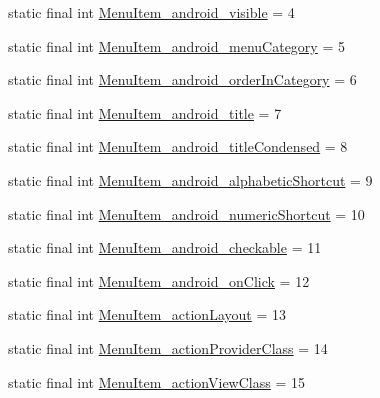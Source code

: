 \begin{DoxyCompactItemize}
\item 
static final int \mbox{\hyperlink{classcom_1_1google_1_1android_1_1gms_1_1R_1_1styleable_ac66c73b7d062d9fbd9d072b092a8cb1e}{Menu\+Item\+\_\+android\+\_\+visible}} = 4
\item 
static final int \mbox{\hyperlink{classcom_1_1google_1_1android_1_1gms_1_1R_1_1styleable_ad9c978e812e621ca253e4d82d4198385}{Menu\+Item\+\_\+android\+\_\+menu\+Category}} = 5
\item 
static final int \mbox{\hyperlink{classcom_1_1google_1_1android_1_1gms_1_1R_1_1styleable_af390bd45b76355084e816767e49eee64}{Menu\+Item\+\_\+android\+\_\+order\+In\+Category}} = 6
\item 
static final int \mbox{\hyperlink{classcom_1_1google_1_1android_1_1gms_1_1R_1_1styleable_a1c0c3275e3807999c30010d6a838b34b}{Menu\+Item\+\_\+android\+\_\+title}} = 7
\item 
static final int \mbox{\hyperlink{classcom_1_1google_1_1android_1_1gms_1_1R_1_1styleable_a85416d106e9733299582835e0931e23f}{Menu\+Item\+\_\+android\+\_\+title\+Condensed}} = 8
\item 
static final int \mbox{\hyperlink{classcom_1_1google_1_1android_1_1gms_1_1R_1_1styleable_a4d7a01122fd3961ce015ca26ca0e8896}{Menu\+Item\+\_\+android\+\_\+alphabetic\+Shortcut}} = 9
\item 
static final int \mbox{\hyperlink{classcom_1_1google_1_1android_1_1gms_1_1R_1_1styleable_a52cc1e319e44cdb18864d29de5a76be5}{Menu\+Item\+\_\+android\+\_\+numeric\+Shortcut}} = 10
\item 
static final int \mbox{\hyperlink{classcom_1_1google_1_1android_1_1gms_1_1R_1_1styleable_a0e4231e2764dcba193f04158aefb183b}{Menu\+Item\+\_\+android\+\_\+checkable}} = 11
\item 
static final int \mbox{\hyperlink{classcom_1_1google_1_1android_1_1gms_1_1R_1_1styleable_a6ca2c9bee4022f8c7fddb6f79a3a9d22}{Menu\+Item\+\_\+android\+\_\+on\+Click}} = 12
\item 
static final int \mbox{\hyperlink{classcom_1_1google_1_1android_1_1gms_1_1R_1_1styleable_a50ab0ace1ce82c6ad7556f5342fa39f5}{Menu\+Item\+\_\+action\+Layout}} = 13
\item 
static final int \mbox{\hyperlink{classcom_1_1google_1_1android_1_1gms_1_1R_1_1styleable_ac2d54084cc0dce49b122f91c6f2bad7d}{Menu\+Item\+\_\+action\+Provider\+Class}} = 14
\item 
static final int \mbox{\hyperlink{classcom_1_1google_1_1android_1_1gms_1_1R_1_1styleable_a5d15d289a226511bc6a7521b552d26c2}{Menu\+Item\+\_\+action\+View\+Class}} = 15

\end{DoxyCompactItemize}
